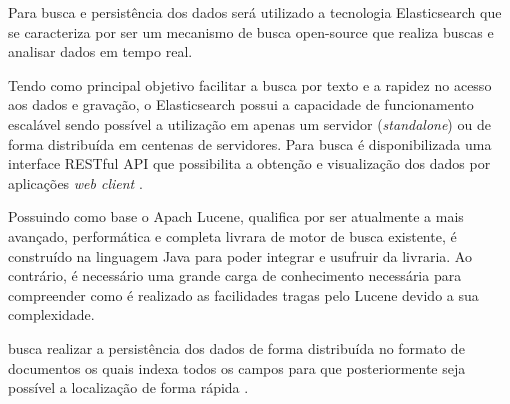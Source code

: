 Para busca e persistência dos dados será utilizado a tecnologia Elasticsearch que se caracteriza por ser um mecanismo de busca open-source que realiza buscas e analisar dados em tempo real.

Tendo como principal objetivo facilitar a busca por texto e a rapidez no acesso aos dados e gravação, o Elasticsearch possui a capacidade de funcionamento escalável sendo possível a utilização em apenas um servidor (\textit{standalone}) ou de forma distribuída em centenas de servidores.  Para busca é disponibilizada uma interface RESTful API que possibilita a obtenção e visualização dos dados por aplicações \textit{web client} \cite{Gormley:2015}.

Possuindo como base o Apach Lucene, qualifica por ser atualmente a mais avançado, performática e completa livrara de motor de busca existente, é construído na linguagem Java para poder integrar e usufruir da livraria. Ao contrário, é necessário uma grande carga de conhecimento necessária para compreender como é realizado as facilidades tragas pelo Lucene devido a sua complexidade.

busca realizar a persistência dos dados de forma distribuída no formato de documentos os quais indexa todos os campos para que posteriormente seja possível a localização de forma rápida \cite{Gormley:2015}. 
